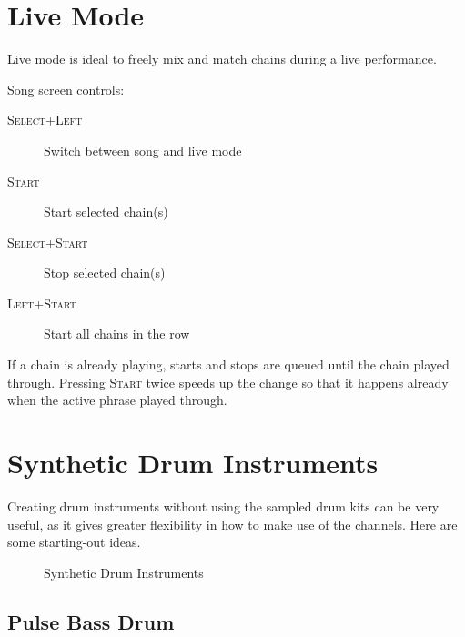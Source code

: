 \section{Live Mode}

Live mode is ideal to freely mix and match chains during a live performance.

Song screen controls:

\begin{description}
	\item[\textsc{Select+Left}] Switch between song and live mode
	\item[\textsc{Start}] Start selected chain(s)
	\item[\textsc{Select+Start}] Stop selected chain(s)
	\item[\textsc{Left+Start}] Start all chains in the row
\end{description}

If a chain is already playing, starts and stops are queued until the chain played through.
Pressing \textsc{Start} twice speeds up the change so that it happens already when the active phrase played through.

\section{Synthetic Drum Instruments}

Creating drum instruments without using the sampled drum kits can be very useful, as it gives greater flexibility in how to make use of the channels. Here are some starting-out ideas.

\begin{figure}[hbtp]
	\centering
	\qquad

	\qquad

	\qquad

	\caption{Synthetic Drum Instruments}
	\label{fig:instr-examples}
\end{figure}

\subsection{Pulse Bass Drum}

